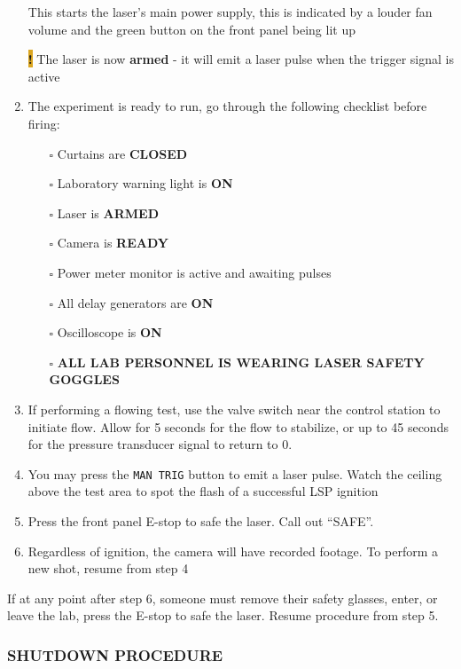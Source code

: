 \begin{enumerate}
  {\color{cyan} This starts the laser's main power supply, this is indicated by a
  louder fan volume and the green button on the front panel being lit up}

  \colorbox{Goldenrod}{\textbf{!}} The laser is now \textbf{armed} - it will emit a laser pulse when
  the trigger signal is active
\item
  The experiment is ready to run, go through the following checklist
  before firing:

  \begin{itemize}
  
  \item[$\square$]
    Curtains are \textbf{CLOSED}
  \item[$\square$]
    Laboratory warning light is \textbf{ON}
  \item[$\square$]
    Laser is \textbf{ARMED}
  \item[$\square$]
    Camera is \textbf{READY}
  \item[$\square$]
    Power meter monitor is active and awaiting pulses
  \item[$\square$]
    All delay generators are \textbf{ON}
  \item[$\square$]
    Oscilloscope is \textbf{ON}
  \item[$\square$]
    \textbf{ALL LAB PERSONNEL IS WEARING LASER
    SAFETY GOGGLES}
  \end{itemize}
\item
  If performing a flowing test, use the valve switch near the control
  station to initiate flow. Allow for 5 seconds for the flow to
  stabilize, or up to 45 seconds for the pressure transducer signal to
  return to 0.
\item
  You may press the \texttt{MAN\ TRIG} button to emit a laser pulse.
  Watch the ceiling above the test area to spot the flash of a
  successful LSP ignition
\item
  Press the front panel E-stop to safe the laser. Call out ``SAFE''.
\item
  Regardless of ignition, the camera will have recorded footage. To
  perform a new shot, resume from step 4
\end{enumerate}

{\color{cyan} If at any point after step 6, someone must remove their safety
glasses, enter, or leave the lab, press the E-stop to safe the laser.
Resume procedure from step 5.}

\subsubsection{SHUTDOWN PROCEDURE}\label{shutdown-procedure}

